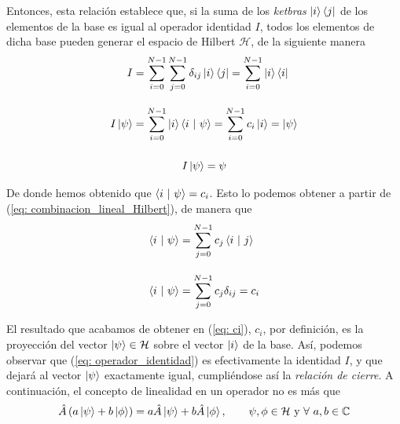 \documentclass{article}
\numberwithin{equation}{section} %
\begin{document}
    \vspace{1.5mm}

    Entonces, esta relación establece que, si la suma de los \textit{ketbras} \( \ket{i} \bra{j} \) de los elementos de la base es igual al operador identidad \( I \), todos los elementos de dicha base pueden generar el espacio de Hilbert \( \mathcal{H} \), de la siguiente manera
    \begin{align*}
        I &= \sum_{i = 0}^{N - 1} \sum_{j = 0}^{N -1} \delta_{ij} \ket{i} \bra{j} = \sum_{i = 0}^{N -1} \ket{i} \bra{i} \\[10pt]
        I \ket{\psi} &= \sum_{i = 0}^{N - 1} \ket{i} \braket{i \ | \ \psi} = \sum_{i = 0}^{N - 1} c_{i} \ket{i} = \ket{\psi} \\[10pt]
    \end{align*}
    \begin{equation}
        I \ket{\psi} = \psi
        \label{eq: operador_identidad}
    \end{equation}

    \vspace{1.5mm}

    De donde hemos obtenido que \( \braket{i \ | \ \psi} = c_{i} \). Esto lo podemos obtener a partir de (\ref{eq: combinacion_lineal_Hilbert}), de manera que
    \begin{align}
        \braket{i \ | \ \psi} &= \sum_{j = 0}^{N - 1} c_{j} \braket{i \ | \ j} \\[10pt]
        \braket{i \ | \ \psi} &= \sum_{j = 0}^{N - 1} c_{j} \delta_{ij} = c_{i}\label{eq: ci}
    \end{align}
    
    \vspace{1.5mm}

    El resultado que acabamos de obtener en (\ref{eq: ci}), \( c_{i} \), por definición, es la proyección del vector \( \ket{\psi} \in \mathcal{H} \) sobre el vector \( \ket{i} \) de la base. Así, podemos observar que (\ref{eq: operador_identidad}) es efectivamente la identidad \( I \), y que dejará al vector \( \ket{\psi}\) exactamente igual, cumpliéndose así la \textit{relación de cierre}. A continuación, el concepto de linealidad en un operador no es más que
    \begin{equation}
        \hat{A} \left( a \ket{\psi} + b \ket{\phi} \right) = a \hat{A} \ket{\psi} + b \hat{A} \ket{\phi}, \qquad \psi, \phi \in  \mathcal{H} \ \text{y} \ \forall \ a,b \in \mathbb{C} 
        \label{eq: linealidad_operador}
    \end{equation}
\end{document}
